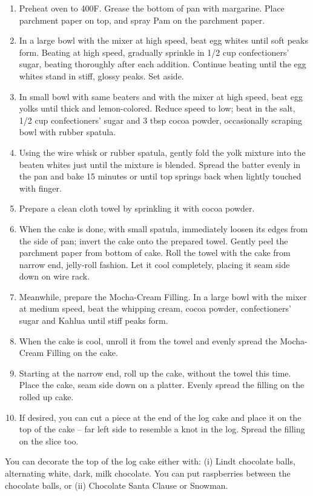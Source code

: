 \begin{enumerate}
    \item Preheat oven to 400\degree F. Grease the bottom of pan with margarine. Place parchment paper on top, and spray Pam on the parchment paper.
    \item In a large bowl with the mixer at high speed, beat egg whites until soft peaks form. Beating at high speed, gradually sprinkle in 1/2 cup confectioners’ sugar, beating thoroughly after each addition. Continue beating until the egg whites stand in stiff, glossy peaks. Set aside.
    \item In small bowl with same beaters and with the mixer at high speed, beat egg yolks until thick and lemon-colored. Reduce speed to low; beat in the salt, 1/2 cup confectioners’ sugar and 3 tbsp cocoa powder, occasionally scraping bowl with rubber spatula.
    \item Using the wire whisk or rubber spatula, gently fold the yolk mixture into the beaten whites just until the mixture is blended. Spread the batter evenly in the pan and bake 15 minutes or until top springs back when lightly touched with finger.
    \item Prepare a clean cloth towel by sprinkling it with cocoa powder.
    \item When the cake is done, with small spatula, immediately loosen its edges from the side of pan; invert the cake onto the prepared towel. Gently peel the parchment paper from bottom of cake. Roll the towel with the cake from narrow end, jelly-roll fashion. Let it cool completely, placing it seam side down on wire rack.
    \item Meanwhile, prepare the Mocha-Cream Filling. In a large bowl with the mixer at medium speed, beat the whipping cream, cocoa powder, confectioners’ sugar and Kahlua until stiff peaks form.
    \item When the cake is cool, unroll it from the towel and evenly spread the Mocha-Cream Filling on the cake.
    \item Starting at the narrow end, roll up the cake, without the towel this time. Place the cake, seam side down on a platter. Evenly spread the filling on the rolled up cake.
    \item If desired, you can cut a piece at the end of the log cake and place it on the top of the cake – far left side to resemble a knot in the log. Spread the filling on the slice too.
\end{enumerate}

You can decorate the top of the log cake either with: (i) Lindt chocolate balls, alternating white, dark, milk chocolate. You can put raspberries between the chocolate balls, or (ii) Chocolate Santa Clause or Snowman.

